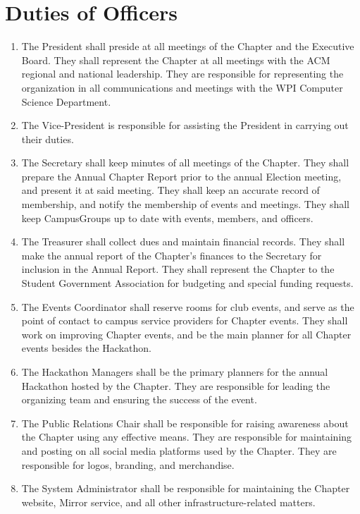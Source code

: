 \documentclass[12pt, letterpaper, oneside]{book}
\begin{document}
\section{Duties of Officers}
\begin{enumerate}
    \item The President shall preside at all meetings of the Chapter
        and the Executive Board. They shall represent the Chapter at all
        meetings with the ACM regional and national leadership. They are
        responsible for representing the organization in all communications and
        meetings with the WPI Computer Science Department.
    \item The Vice-President is responsible for assisting the President in
        carrying out their duties.
    \item The Secretary shall keep minutes of all meetings of the Chapter. They
        shall prepare the Annual Chapter Report prior to the annual Election
        meeting, and present it at said meeting. They shall keep an accurate
        record of membership, and notify the membership of events and meetings.
        They shall keep CampusGroups up to date with events, members, and
        officers.
    \item The Treasurer shall collect dues and maintain financial records. They
        shall make the annual report of the Chapter's finances to the Secretary
        for inclusion in the Annual Report. They shall represent the Chapter to
        the Student Government Association for budgeting and special funding
        requests.
    \item The Events Coordinator shall reserve rooms for club events, and serve
        as the point of contact to campus service providers for Chapter events.
        They shall work on improving Chapter events, and be the main planner for
        all Chapter events besides the Hackathon.
    \item The Hackathon Managers shall be the primary planners for the annual
        Hackathon hosted by the Chapter. They are responsible for leading the
        organizing team and ensuring the success of the event.
    \item The Public Relations Chair shall be responsible for raising awareness
        about the Chapter using any effective means. They are responsible for
        maintaining and posting on all social media platforms used by the
        Chapter. They are responsible for logos, branding, and merchandise.
    \item The System Administrator shall be responsible for maintaining the
        Chapter website, Mirror service, and all other infrastructure-related
        matters.
\end{enumerate}
\end{document}
